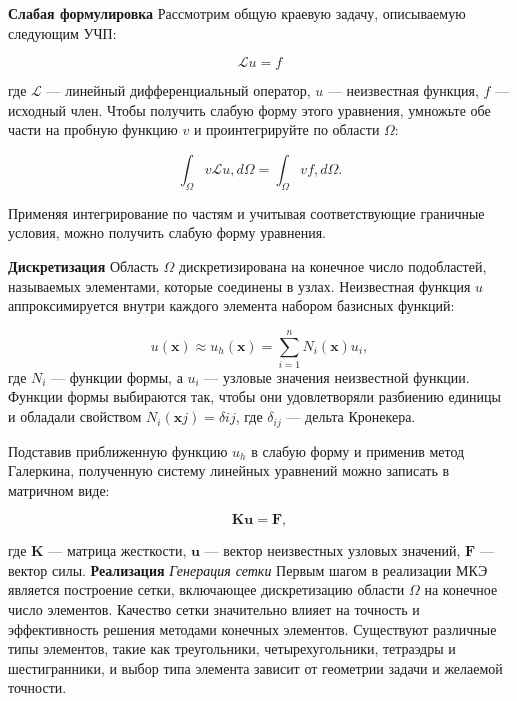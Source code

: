 \textbf{Слабая формулировка}
Рассмотрим общую краевую задачу, описываемую следующим УЧП:

\begin{equation*}
\mathcal{L}u=f
\end{equation*}

где $\mathcal{L}$ — линейный дифференциальный оператор,
$u$ — неизвестная функция, $f$ — исходный член.
Чтобы получить слабую форму этого уравнения,
умножьте обе части на пробную функцию
$v$ и проинтегрируйте по области $\Omega$:

\begin{equation*}
\int_{\Omega} v \mathcal{L}u , d\Omega = \int_{\Omega} vf , d\Omega.
\end{equation*}

Применяя интегрирование по частям и учитывая соответствующие
граничные условия, можно получить слабую форму уравнения.

\textbf{Дискретизация}
Область $\Omega$ дискретизирована на конечное число подобластей,
называемых элементами, которые соединены в узлах.
Неизвестная функция $u$ аппроксимируется внутри каждого
элемента набором базисных функций:

\begin{equation*}
u(\mathbf{x}) \approx u_h(\mathbf{x}) = \sum_{i=1}^{n} N_i(\mathbf{x}) u_i,
\end{equation*}
где $N_i$ — функции формы, а $u_i$ — узловые значения неизвестной функции.
Функции формы выбираются так, чтобы они удовлетворяли разбиению единицы
и обладали свойством $N_i(\mathbf{x}j)=\delta{ij}$,
где $\delta_{ij}$ — дельта Кронекера.

Подставив приближенную функцию $u_h$ в слабую форму и применив
метод Галеркина, полученную систему линейных
уравнений можно записать в матричном виде:

\begin{equation*}
\mathbf{K} \mathbf{u} = \mathbf{F},
\end{equation*}

где $\mathbf{K}$ — матрица жесткости, $\mathbf{u}$ — вектор
неизвестных узловых значений, $\mathbf{F}$ — вектор силы.
\textbf{Реализация}
\textit{Генерация сетки}
Первым шагом в реализации МКЭ является построение сетки,
включающее дискретизацию области $\Omega$ на конечное число элементов.
Качество сетки значительно влияет на точность
и эффективность решения методами конечных элементов.
Существуют различные типы элементов, такие как треугольники,
четырехугольники, тетраэдры и шестигранники, и выбор типа элемента
зависит от геометрии задачи и желаемой точности.

